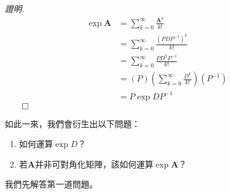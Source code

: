 \documentclass[12pt]{article}
\renewenvironment*{proof}{\textit{證明.}}{\hfill$\qed$}
\begin{document}
    \begin{proof}
        \begin{align*}
            \exp{\mathbf{A}}&=\sum_{k=0}^{\infty}\frac{\mathbf{A}^k}{k!}\\&=\sum_{k=0}^{\infty}\frac{(PDP^{-1})^k}{k!}\\&=\sum_{k=0}^{\infty}\frac{PD^kP^{-1}}{k!}\\&=(P)(\sum_{k=0}^{\infty}\frac{D^k}{k!})(P^{-1})\\&=P\exp{D}P^{-1}
        \end{align*}
    \end{proof}

    如此一來，我們會衍生出以下問題：\begin{enumerate}
        \item 如何運算$\exp{D}$？
        \item 若$\mathbf{A}$并非可對角化矩陣，該如何運算$\exp{\mathbf{A}}$？
    \end{enumerate}

    我們先解答第一道問題。
\end{document}
